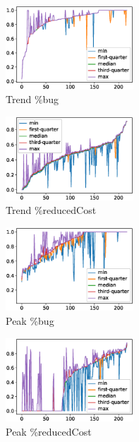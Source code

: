 \begin{figure}[t!]
  \centering
  \begin{subfigure}{0.24\textwidth}
    \includegraphics[width=4.8cm]{figure/trend-bug.eps}
	 \caption{Trend \%bug}
	 \label{fig:trend-b}
  \end{subfigure}
  \begin{subfigure}{0.24\textwidth}
    \includegraphics[width=4.8cm]{figure/trend-cost.eps}
	\caption{Trend \%reducedCost}
   \label{fig:trend-c}
  \end{subfigure}
  \begin{subfigure}{0.24\textwidth}
    \includegraphics[width=4.8cm]{figure/arrival-bug.eps}
	\caption{Peak \%bug}
    \label{fig:peak-b}
  \end{subfigure}
  \begin{subfigure}{0.24\textwidth}
    \includegraphics[width=4.8cm]{figure/arrival-cost.eps}
	\caption{Peak \%reducedCost}
    \label{fig:peak-c}
  \end{subfigure}
  \begin{subfigure}{0.24\textwidth}

\end{subfigure}
\end{figure}
